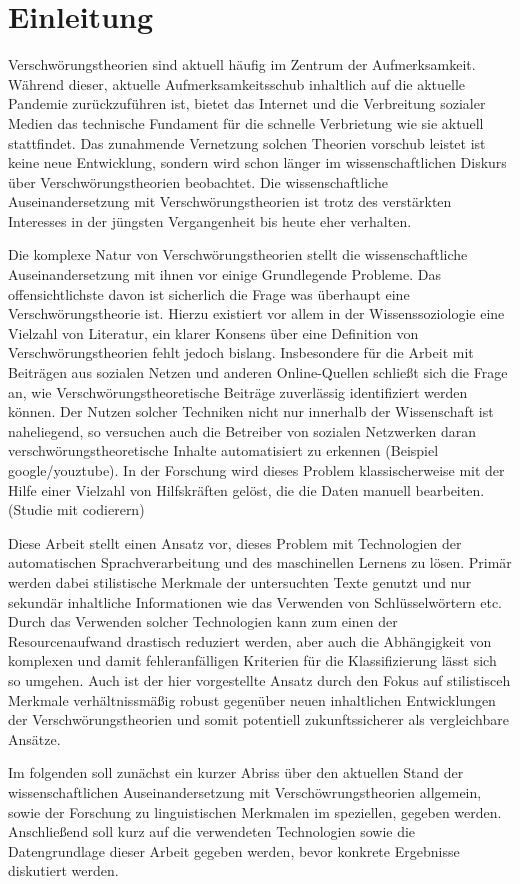 \section{Einleitung}

Verschwörungstheorien sind aktuell häufig im Zentrum der Aufmerksamkeit.
Während dieser, aktuelle Aufmerksamkeitsschub inhaltlich auf die aktuelle Pandemie zurückzuführen ist, bietet das Internet und die Verbreitung sozialer Medien das technische Fundament für die schnelle Verbrietung wie sie aktuell stattfindet.
Das zunahmende Vernetzung solchen Theorien vorschub leistet ist keine neue Entwicklung, sondern wird schon länger im wissenschaftlichen Diskurs über Verschwörungstheorien beobachtet.
Die wissenschaftliche Auseinandersetzung mit Verschwörungstheorien ist trotz des verstärkten Interesses in der jüngsten Vergangenheit bis heute eher verhalten.

Die komplexe Natur von Verschwörungstheorien stellt die wissenschaftliche Auseinandersetzung mit ihnen vor einige Grundlegende Probleme.
Das offensichtlichste davon ist sicherlich die Frage was überhaupt eine Verschwörungstheorie ist.
Hierzu existiert vor allem in der Wissenssoziologie eine Vielzahl von Literatur, ein klarer Konsens über eine Definition von Verschwörungstheorien fehlt jedoch bislang.
Insbesondere für die Arbeit mit Beiträgen aus sozialen Netzen und anderen Online-Quellen schließt sich die Frage an, wie Verschwörungstheoretische Beiträge zuverlässig identifiziert werden können.
Der Nutzen solcher Techniken nicht nur innerhalb der Wissenschaft ist naheliegend, so versuchen auch die Betreiber von sozialen Netzwerken daran verschwörungstheoretische Inhalte automatisiert zu erkennen (Beispiel google/youztube).
In der Forschung wird dieses Problem klassischerweise mit der Hilfe einer Vielzahl von Hilfskräften gelöst, die die Daten manuell bearbeiten. (Studie mit codierern)

Diese Arbeit stellt einen Ansatz vor, dieses Problem mit Technologien der automatischen Sprachverarbeitung und des maschinellen Lernens zu lösen.
Primär werden dabei stilistische Merkmale der untersuchten Texte genutzt und nur sekundär inhaltliche Informationen wie das Verwenden von Schlüsselwörtern etc.
Durch das Verwenden solcher Technologien kann zum einen der Resourcenaufwand drastisch reduziert werden, aber auch die Abhängigkeit von komplexen und damit fehleranfälligen Kriterien für die Klassifizierung lässt sich so umgehen.
Auch ist der hier vorgestellte Ansatz durch den Fokus auf stilistisceh Merkmale verhältnissmäßig robust gegenüber neuen inhaltlichen Entwicklungen der Verschwörungstheorien und somit potentiell zukunftssicherer als vergleichbare Ansätze.

Im folgenden soll zunächst ein kurzer Abriss über den aktuellen Stand der wissenschaftlichen Auseinandersetzung mit Verschöwrungstheorien allgemein, sowie der Forschung zu linguistischen Merkmalen im speziellen, gegeben werden.
Anschließend soll kurz auf die verwendeten Technologien sowie die Datengrundlage dieser Arbeit gegeben werden, bevor konkrete Ergebnisse diskutiert werden.